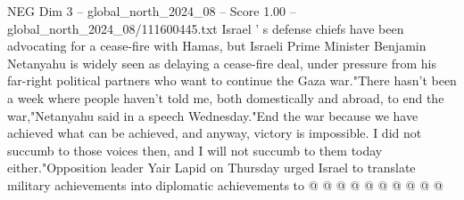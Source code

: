 \begin{textsample}{NEG Dim 3 – global\_north\_2024\_08 – Score 1.00 – global\_north\_2024\_08/111600445.txt}
Israel ' s defense chiefs have been advocating for a cease-fire with Hamas, but Israeli Prime Minister Benjamin Netanyahu is widely seen as delaying a cease-fire deal, under pressure from his far-right political partners who want to continue the Gaza war."There hasn't been a week where people haven't told me, both domestically and abroad, to end the war,"Netanyahu said in a speech Wednesday."End the war because we have achieved what can be achieved, and anyway, victory is impossible.
I did not succumb to those voices then, and I will not succumb to them today either."Opposition leader Yair Lapid on Thursday urged Israel to translate military achievements into diplomatic achievements to @ @ @ @ @ @ @ @ @ @

\end{textsample}
